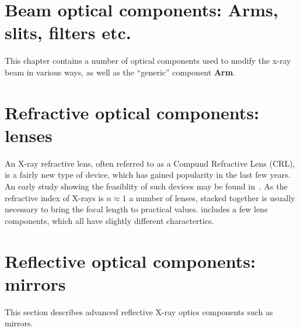 
\chapter{Beam optical components:
Arms, slits, filters etc.}
This chapter contains a number of optical components
used to modify the x-ray beam in various ways,
as well as the ``generic'' component \textbf{Arm}.













\newpage
\chapter{Refractive optical components: lenses}
\label{c:lenses}

An X-ray refractive lens, often referred to as a Compund Refractive Lens (CRL), is a fairly new type of device, which has gained popularity in
the last few years. An early study showing the feasiblity of such devices may be found in~\cite{snigirev1996}. As the refractive index of X-rays
is $n\approx1$ a number of lenses, stacked together is usually necessary to bring the focal length to practical values. 
\MCX includes a few lens components, which all have slightly different charactertics.

%








\newpage
\chapter{Reflective optical components: mirrors}
\label{c:mirrors}
This section describes advanced reflective X-ray optics
components such as mirrors.
%






